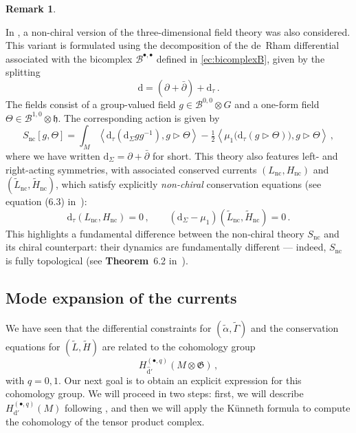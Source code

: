\documentclass[11pt]{amsart}
\newcommand{\dr}{{\mathrm{d}}}
\newcommand{\CB}{{\mathcal B}}
\numberwithin{equation}{section}
\numberwithin{figure}{section}
\numberwithin{table}{section}
\theoremstyle{thm}
\numberwithin{equation}{subsection}
\theoremstyle{definition}
\theoremstyle{rem}
\newtheorem{remark}{Remark}
\begin{document}
\begin{remark}\label{nonchiral}


In \cite{Chen:2024axr,Chen:2023integrable}, a non-chiral version of the three-dimensional field theory was also considered. This variant is formulated using the decomposition of the de~Rham differential associated with the bicomplex \(\CB^{\bullet,\bullet}\) defined in \eqref{ec:bicomplexB}, given by the splitting
\begin{equation}
        \mathrm{d} = (\partial + \bar{\partial}) + \mathrm{d}_\tau\,.
\end{equation}
The fields consist of a group-valued field \(g \in \CB^{0,0} \otimes G\) and a one-form field \(\Theta \in \CB^{1,0} \otimes \mathfrak{h}\). The corresponding action is given by
\begin{equation}
\label{ec:nonchiralaction}
      S_{\text{nc}}[g,\Theta] = \int_M \left\langle \mathrm{d}_\tau(\mathrm{d}_\Sigma g g^{-1}), g \rhd \Theta \right\rangle 
    - \tfrac{1}{2} \left\langle \mu_1\big(\mathrm{d}_\tau(g \rhd \Theta)\big), g \rhd \Theta \right\rangle\,, 
\end{equation}
where we have written $\dr_\Sigma = \partial + \bar \partial$ for short. This theory also features left- and right-acting symmetries, with associated conserved currents \((L_{\text{nc}}, H_{\text{nc}})\) and \((\tilde{L}_{\text{nc}}, \tilde{H}_{\text{nc}})\), which satisfy explicitly \textit{non-chiral} conservation equations (see equation (6.3) in~\cite{Chen:2023integrable}):
\begin{equation*}
    \dr_\tau(L_{\text{nc}}, H_{\text{nc}}) = 0\,, \qquad (\dr_\Sigma - \mu_1)(\tilde{L}_{\text{nc}}, \tilde{H}_{\text{nc}}) = 0\,.
\end{equation*}
This highlights a fundamental difference between the non-chiral theory \(S_{\mathrm{nc}}\) and its chiral counterpart: their dynamics are fundamentally different --- indeed, \(S_{\mathrm{nc}}\) is fully topological (see \textbf{Theorem}~6.2 in~\cite{Chen:2024axr}).

\end{remark}




\subsection{Mode expansion of the currents}\label{ravpolys}

We have seen that the differential constraints for $(\tilde \alpha,\tilde\Gamma)$ and the conservation equations for \((\tilde{L}, \tilde{H})\) are related to the cohomology group
\begin{equation}
    H_{\hat{\mathrm{d}}'}^{(\bullet,q)}(M \otimes \mathfrak{G})\,,
\end{equation}
with $q=0,1$. Our next goal is to obtain an explicit expression for this cohomology group.
We will proceed in two steps: first, we will describe 
\(H^{(\bullet,q)}_{\mathrm{d}'}(M)\) following \cite{Garner:2023zqn}, 
and then we will apply the Künneth formula to compute the cohomology of 
the tensor product complex. 
\end{document}

